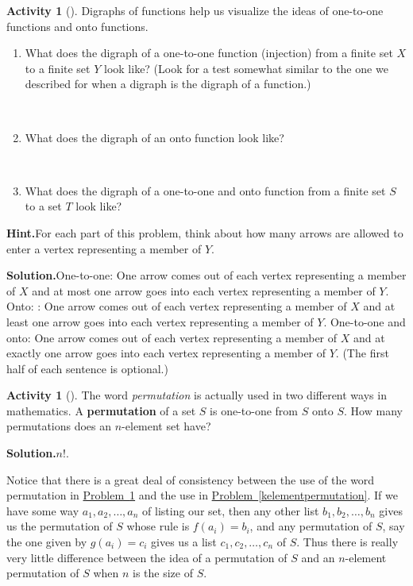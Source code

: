 \documentclass[10pt,]{book}
\newcommand{\terminology}[1]{\textbf{#1}}
\theoremstyle{plain}
\theoremstyle{definition}
\newtheorem{activity}[project]{Activity}
\numberwithin{equation}{chapter}
\begin{document}
\begin{activity}[]\label{activity-26}
Digraphs of functions help us visualize the ideas of one-to-one functions and onto functions.%
~\par
\begin{enumerate}[label=(\alph*)]
 \item What does the digraph of a one-to-one function (injection) from a finite set \(X\) to a finite set \(Y\) look like? (Look for a test somewhat similar to the one we described for when a digraph is the digraph of a function.)%

~\par
\item What does the digraph of an onto function look like?%

~\par
\item What does the digraph of a one-to-one and onto function from a finite set \(S\) to a set \(T\) look like?%

\end{enumerate}
\par\medskip\noindent%
\textbf{Hint.}\quad For each part of this problem, think about how many arrows are allowed to enter a vertex representing a member of \(Y\).%
\par\medskip\noindent%
\textbf{Solution.}\quad One-to-one: One arrow comes out of each vertex representing a member of \(X\) and at most one arrow goes into each vertex representing a member of \(Y\). Onto: : One arrow comes out of each vertex representing a member of \(X\) and at least one arrow goes into each vertex representing a member of \(Y\). One-to-one and onto: One arrow comes out of each vertex representing a member of \(X\) and at exactly one arrow goes into each vertex representing a member of \(Y\). (The first half of each sentence is optional.)%
\end{activity}
\begin{activity}[]\label{permutationasbijection}
The word \emph{permutation} is actually used in two different ways in mathematics. A \terminology{permutation} of a set \(S\) is one-to-one from \(S\) onto \(S\). How many permutations does an \(n\)-element set have?%
\par\medskip\noindent%
\textbf{Solution.}\quad \(n!\).%
\end{activity}
Notice that there is a great deal of consistency between the use of the word permutation in \hyperref[permutationasbijection]{Problem~\ref{permutationasbijection}} and the use in \hyperref[kelementpermutation]{Problem~\ref{kelementpermutation}}. If we have some way \(a_1,a_2,\ldots,a_n\) of listing our set, then any other list \(b_1,b_2,\ldots,b_n\) gives us the permutation of \(S\) whose rule is \(f(a_i) =b_i\), and any permutation of \(S\), say the one given by \(g(a_i)=c_i\) gives us a list \(c_1,c_2,\ldots,c_n\) of \(S\). Thus there is really very little difference between the idea of a permutation of \(S\) and an \(n\)-element permutation of \(S\) when \(n\) is the size of \(S\).%
\typeout{************************************************}
\typeout{************************************************}
\end{document}
